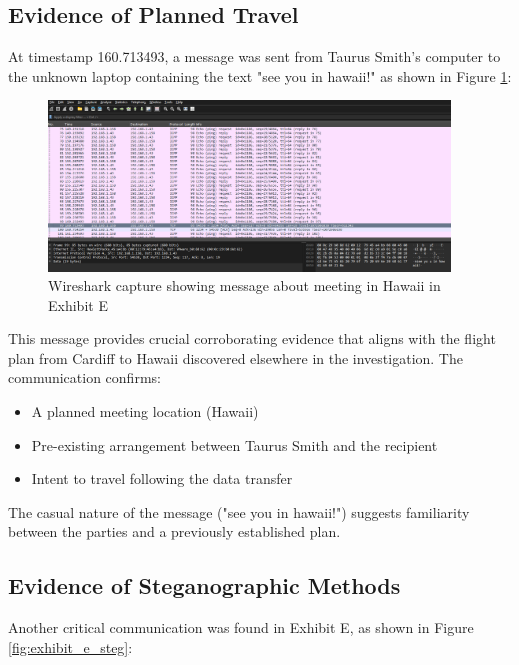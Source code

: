 \subsection{Evidence of Planned Travel}
At timestamp 160.713493, a message was sent from Taurus Smith's computer to the unknown laptop containing the text "see you in hawaii!" as shown in Figure \ref{fig:exhibit_e_hawaii}:

\begin{figure}[htbp]
    \centering
    \includegraphics[width=0.95\textwidth]{images/Network_Analysis/ExhibitE_pcap_hawaii.png}
    \caption{Wireshark capture showing message about meeting in Hawaii in Exhibit E}
    \label{fig:exhibit_e_hawaii}
\end{figure}

This message provides crucial corroborating evidence that aligns with the flight plan from Cardiff to Hawaii discovered elsewhere in the investigation. The communication confirms:

\begin{itemize}
    \item A planned meeting location (Hawaii)
    \item Pre-existing arrangement between Taurus Smith and the recipient
    \item Intent to travel following the data transfer
\end{itemize}

The casual nature of the message ("see you in hawaii!") suggests familiarity between the parties and a previously established plan.

\subsection{Evidence of Steganographic Methods}
Another critical communication was found in Exhibit E, as shown in Figure \ref{fig:exhibit_e_steg}:

